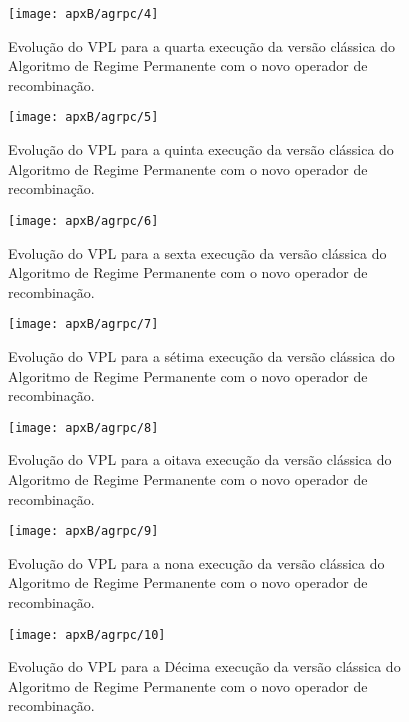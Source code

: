 \begin{figure}[H]
\centering
\texttt{[image: apxB/agrpc/4]}
\caption{Evolução do VPL para a quarta execução da versão clássica do Algoritmo de Regime Permanente com o novo operador de recombinação.}
\label{fig:graphRPC2-04}
\end{figure}

\begin{figure}[H]
\centering
\texttt{[image: apxB/agrpc/5]}
\caption{Evolução do VPL para a quinta execução da versão clássica do Algoritmo de Regime Permanente com o novo operador de recombinação.}
\label{fig:graphRPC2-05}
\end{figure}

\begin{figure}[H]
\centering
\texttt{[image: apxB/agrpc/6]}
\caption{Evolução do VPL para a sexta execução da versão clássica do Algoritmo de Regime Permanente com o novo operador de recombinação.}
\label{fig:graphRPC2-06}
\end{figure}

\begin{figure}[H]
\centering
\texttt{[image: apxB/agrpc/7]}
\caption{Evolução do VPL para a sétima execução da versão clássica do Algoritmo de Regime Permanente com o novo operador de recombinação.}
\label{fig:graphRPC2-07}
\end{figure}

\begin{figure}[H]
\centering
\texttt{[image: apxB/agrpc/8]}
\caption{Evolução do VPL para a oitava execução da versão clássica do Algoritmo de Regime Permanente com o novo operador de recombinação.}
\label{fig:graphRPC2-08}
\end{figure}


\begin{figure}[H]
\centering
\texttt{[image: apxB/agrpc/9]}
\caption{Evolução do VPL para a nona execução da versão clássica do Algoritmo de Regime Permanente com o novo operador de recombinação.}
\label{fig:graphRPC2-09}
\end{figure}

\begin{figure}[H]
\centering
\texttt{[image: apxB/agrpc/10]}
\caption{Evolução do VPL para a Décima execução da versão clássica do Algoritmo de Regime Permanente com o novo operador de recombinação.}
\label{fig:graphRPC2-10}
\end{figure}